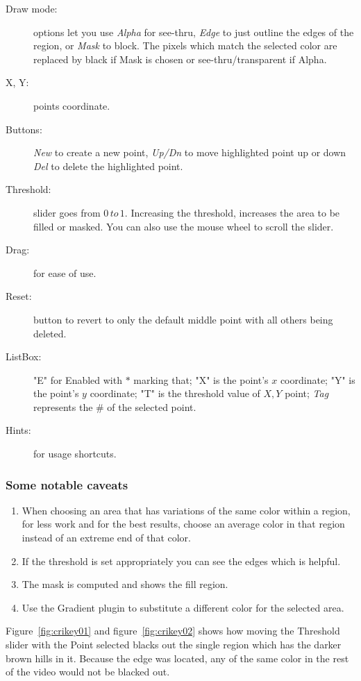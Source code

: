 \begin{description}
    \item[Draw mode:] options let you use \textit{Alpha} for see-thru, \textit{Edge} to just outline the edges of the region, or \textit{Mask} to block. The pixels which match the selected color are replaced by black if Mask is chosen or see-thru/transparent if Alpha.
    \item[X, Y:] points coordinate.
    \item[Buttons:] \textit{New} to create a new point, \textit{Up/Dn} to move highlighted point up or down \textit{Del} to delete the highlighted point.
    \item[Threshold:] slider goes from $0\, to\, 1$. Increasing the threshold, increases the area to be filled or masked. You can also use the mouse wheel to scroll the slider.
    \item[Drag:] for ease of use.
    \item[Reset:] button to revert to only the default middle point with all others being deleted.
    \item[ListBox:] "E" for Enabled with $*$ marking that; "X" is the point’s $x$ coordinate; "Y" is the point’s $y$ coordinate; "T" is the threshold value of $X,Y$ point; \textit{Tag} represents the \# of the selected
    point.
    \item[Hints:] for usage shortcuts.
\end{description}

\subsubsection*{Some notable caveats}
\label{ssub:some_notable_caveats}

\begin{enumerate}
    \item When choosing an area that has variations of the same color within a region, for less work and for the best results, choose an average color in that region instead of an extreme end of that color.
    \item If the threshold is set appropriately you can see the edges which is helpful.
    \item The mask is computed and shows the fill region.
    \item Use the Gradient plugin to substitute a different color for the selected area.
\end{enumerate}

Figure~\ref{fig:crikey01} and figure~\ref{fig:crikey02} shows how moving the Threshold slider with the Point selected blacks out the single region which has the darker brown hills in it. Because the edge was located, any of the same color in the rest of the video would not be blacked out.

